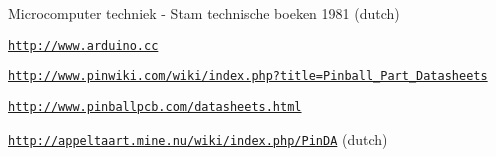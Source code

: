 
\begin{DoxyItemize}
\item Microcomputer techniek -\/ Stam technische boeken 1981 (dutch)
\item \href{http://www.arduino.cc}{\tt http\-://www.\-arduino.\-cc}
\item \href{http://www.pinwiki.com/wiki/index.php?title=Pinball_Part_Datasheets}{\tt http\-://www.\-pinwiki.\-com/wiki/index.\-php?title=\-Pinball\-\_\-\-Part\-\_\-\-Datasheets}
\item \href{http://www.pinballpcb.com/datasheets.html}{\tt http\-://www.\-pinballpcb.\-com/datasheets.\-html}
\item \href{http://appeltaart.mine.nu/wiki/index.php/PinDA}{\tt http\-://appeltaart.\-mine.\-nu/wiki/index.\-php/\-Pin\-D\-A} (dutch) 
\end{DoxyItemize}